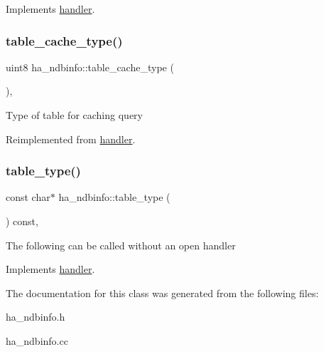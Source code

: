 Implements \mbox{\hyperlink{classhandler_a2502e460566f2c4b506cc1b30eb79e0a}{handler}}.

\mbox{\label{classha__ndbinfo_ab23949e133485226e2c90e78eb914b60}} 
\subsubsection{\texorpdfstring{table\+\_\+cache\+\_\+type()}{table\_cache\_type()}}
{\footnotesize\ttfamily uint8 ha\+\_\+ndbinfo\+::table\+\_\+cache\+\_\+type (\begin{DoxyParamCaption}{ }\end{DoxyParamCaption})\hspace{0.3cm}{\ttfamily [inline]}, {\ttfamily [virtual]}}

Type of table for caching query 

Reimplemented from \mbox{\hyperlink{classhandler_ab4d7cf309121ec10e4150860c8caa12a}{handler}}.

\mbox{\label{classha__ndbinfo_a4f8caa0e516e62ccce4a5f2a52590548}} 
\subsubsection{\texorpdfstring{table\+\_\+type()}{table\_type()}}
{\footnotesize\ttfamily const char$\ast$ ha\+\_\+ndbinfo\+::table\+\_\+type (\begin{DoxyParamCaption}{ }\end{DoxyParamCaption}) const\hspace{0.3cm}{\ttfamily [inline]}, {\ttfamily [virtual]}}

The following can be called without an open handler 

Implements \mbox{\hyperlink{classhandler_ad38f5d3f1e026a0af32b5542aa5ac2f9}{handler}}.



The documentation for this class was generated from the following files\+:\begin{DoxyCompactItemize}
\item 
ha\+\_\+ndbinfo.\+h\item 
ha\+\_\+ndbinfo.\+cc\end{DoxyCompactItemize}
